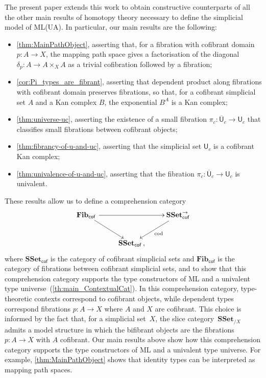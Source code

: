 \documentclass[reqno,10pt,a4paper,oneside,draft]{amsart}
\numberwithin{equation}{section}
\theoremstyle{mythm}
\theoremstyle{mydef}
\theoremstyle{myrmk}
\newcommand{\co}{\colon}
\newcommand{\SSet}{\mathbf{SSet}}
\newcommand{\UU}{\overline{\mathsf{U}}}
\newcommand{\U}{\mathsf{U}}
\begin{document}
 The present paper extends this work to obtain constructive counterparts of all the other main results of 
homotopy theory necessary to define the simplicial model of ML(UA). In particular, our main results are the following:
\begin{itemize}
\item \cref{thm:MainPathObject}, asserting that, for a fibration with cofibrant domain $p \co A \to X$, the mapping path space 
gives a factorisation of the diagonal $\delta_p \co A \to A \times_X A$ as a trivial cofibration followed by a fibration;
\item \cref{cor:Pi_types_are_fibrant}, asserting that dependent product along fibrations with cofibrant
domain preserves fibrations,  so that, for a cofibrant simplicial set $A$ and a Kan complex $B$, the exponential $B^A$ is a Kan complex; 
\item \cref{thm:universe-uc}, asserting the existence of a small fibration $\pi_c \co
\UU_c \to \U_c$ that classifies small fibrations between cofibrant objects;
\item \cref{thm:fibrancy-of-u-and-uc}, asserting that the simplicial set $\U_c$ is a cofibrant Kan complex;
\item \cref{thm:univalence-of-u-and-uc}, asserting that the fibration $\pi_c  \co
\UU_c \to \U_c$ is univalent.
\end{itemize}





These results allow us to define a comprehension category 
\begin{equation*}
\begin{gathered}
\xymatrix{
\mathbf{Fib}_{ \mathsf{cof}} \, \ar[dr] \ar[rr] & & \SSet^{\to}_{\mathsf{cof}} \ar[dl]^{\mathrm{cod}} \\ 
 & \SSet_{\mathsf{cof}} \, , &  }
 \end{gathered}
 \end{equation*}
 where $\SSet_{\mathsf{cof}}$ is the category of cofibrant simplicial sets and  $\mathbf{Fib}_{ \mathsf{cof}}$ is the category of fibrations between cofibrant simplicial
 sets, and to show that this comprehension category supports the type constructors of ML and a univalent type universe~(\cref{th:main_ContextualCat}). In this 
comprehension category, type-theoretic
contexts correspond to cofibrant objects, while dependent types correspond fibrations $p \co A \to X$ where 
 $A$ and $X$ are cofibrant. This choice is informed by the fact that, for a simplicial set~$X$, the slice category~$\mathbf{SSet}_{/X}$ admits a model structure in which the bifibrant objects are
 the fibrations $p \co A \to X$ with $A$ cofibrant. Our main results above show how this comprehension category  supports the type constructors of ML and a univalent type universe.
For example, \cref{thm:MainPathObject} shows that identity types can be interpreted as 
mapping path spaces. 
\end{document}

